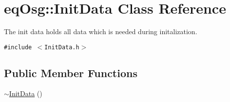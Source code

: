 \hypertarget{a00011}{
\section{eqOsg::InitData Class Reference}
\label{a00011}
}
The init data holds all data which is needed during initalization.  


{\tt \#include $<$InitData.h$>$}

\subsection*{Public Member Functions}
\begin{CompactItemize}
\item 
\hypertarget{a00011_9186b2f084ea9016e1bd8f5c98ccb55e}{
\hyperlink{a00011_9186b2f084ea9016e1bd8f5c98ccb55e}{$\sim$InitData} ()}
\label{a00011_9186b2f084ea9016e1bd8f5c98ccb55e}


\end{CompactItemize}
